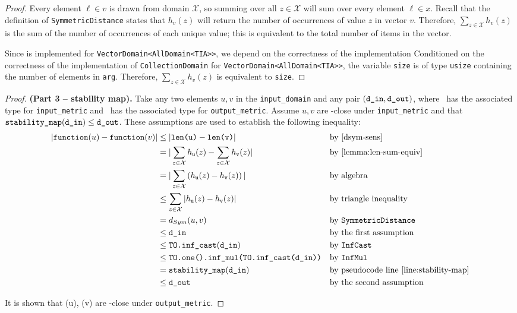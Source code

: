\documentclass{article}
\begin{document}
\begin{proof}
    Every element $\ell \in v$ is drawn from domain $\mathcal{X}$, so summing over all $z\in \mathcal{X}$ will sum over every element $\ell\in x$. 
    Recall that the definition of \texttt{SymmetricDistance} states that $h_v(z)$ will return the number of occurrences of value $z$ in vector $v$.
    Therefore, $\sum_{z\in\mathcal{X}} h_v(z)$ is the sum of the number of occurrences of each unique value; 
    this is equivalent to the total number of items in the vector. 

    Since  is implemented for \texttt{VectorDomain<AllDomain<TIA>>}, 
    we depend on the correctness of the implementation 
    Conditioned on the correctness of the implementation of \texttt{CollectionDomain} for \texttt{VectorDomain<AllDomain<TIA>>},
    the variable \texttt{size} is of type \texttt{usize} containing the number of elements in \texttt{arg}.
    Therefore, $\sum_{z\in\mathcal{X}} h_v(z)$ is equivalent to \texttt{size}.
\end{proof}

\begin{proof} \textbf{(Part 3 -- stability map).} 
    Take any two elements $u, v$ in the \texttt{input\_domain} and any pair $(\texttt{d\_in}, \texttt{d\_out})$, 
    where \din\ has the associated type for \texttt{input\_metric} and \dout\ has the associated type for \texttt{output\_metric}.
    Assume $u, v$ are \din-close under \texttt{input\_metric} and that $\texttt{stability\_map}(\texttt{d\_in}) \leq \texttt{d\_out}$. 
    These assumptions are used to establish the following inequality:
    \begin{align*}
        |\texttt{function}(u) - \texttt{function}(v)| &\leq |\texttt{len(u)} - \texttt{len(v)}| &&\text{by }\ref{dsym-sens} \\
        &= |\sum_{z\in \mathcal{X}} h_{\texttt{u}}(z) - \sum_{z\in \mathcal{X}} h_{\texttt{v}}(z)| &&\text{by } \ref{lemma:len-sum-equiv} \\
        &= |\sum_{z\in \mathcal{X}}\left(h_{\texttt{u}}(z) - h_{\texttt{v}}(z)\right)| &&\text{by algebra} \\
        &\leq \sum_{z\in \mathcal{X}}|h_{\texttt{u}}(z) - h_{\texttt{v}}(z)| &&\text{by triangle inequality} \\
        &= d_{Sym}(u, v) &&\text{by } \texttt{SymmetricDistance}\\
        &\leq \texttt{d\_in} &&\text{by the first assumption} \\
        &\leq \texttt{TO.inf\_cast}(\texttt{d\_in}) &&\text{by } \texttt{InfCast} \\
        &\leq \texttt{TO.one().inf\_mul(TO.inf\_cast(\texttt{d\_in}))} &&\text{by } \texttt{InfMul} \\
        &=\texttt{stability\_map}(\texttt{d\_in}) &&\text{by pseudocode line } \ref{line:stability-map} \\
        &\leq \texttt{d\_out} &&\text{by the second assumption}
    \end{align*}

    It is shown that \function(u), \function(v) are \dout-close under \texttt{output\_metric}.
\end{proof}
\end{document}
